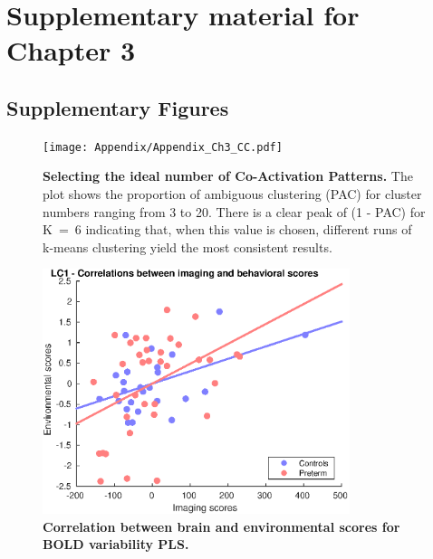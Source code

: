 \appendix
\chapter{Supplementary material for Chapter 3}
\section{Supplementary Figures}
\begin{figure}[h]
\centering
\texttt{[image: Appendix/Appendix\_Ch3\_CC.pdf]}
\caption{\textbf{Selecting the ideal number of Co-Activation Patterns.} The plot shows the proportion of ambiguous clustering (PAC) for cluster numbers ranging from 3 to 20. There is a clear peak of (1 - PAC) for K~=~6 indicating that, when this value is chosen, different runs of k-means clustering yield the most consistent results. }
\label{fig:ch3_consensus}
\end{figure}



\begin{figure}[h]
\centering
\includegraphics[width=0.8\textwidth]{images/Appendix/ch3_BrainScoresxBehavScores.eps}
\caption{\textbf{Correlation between brain and environmental scores for BOLD variability PLS.}  }
\label{fig:ch3_brainXbehavScores}
\end{figure}


